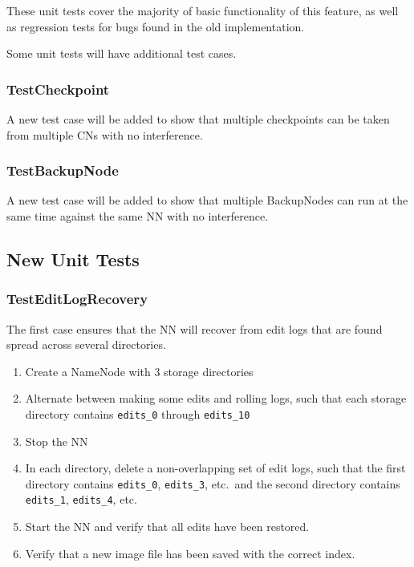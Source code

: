 \documentclass{article}
\begin{document}
These unit tests cover the majority of basic functionality of this feature, as well as regression tests for bugs found in the old implementation.

Some unit tests will have additional test cases.

\subsubsection{TestCheckpoint}

A new test case will be added to show that multiple checkpoints can be taken from multiple CNs with no interference.

\subsubsection{TestBackupNode}

A new test case will be added to show that multiple BackupNodes can run at the same time against the same NN with no interference.

\subsection{New Unit Tests}

\subsubsection{TestEditLogRecovery}

The first case ensures that the NN will recover from edit logs that are found spread across several directories.

\begin{enumerate}
\item Create a NameNode with 3 storage directories
\item Alternate between making some edits and rolling logs, such that each storage directory contains {\tt edits\_0} through {\tt edits\_10}
\item Stop the NN
\item In each directory, delete a non-overlapping set of edit logs, such that the first directory contains {\tt edits\_0}, {\tt edits\_3}, etc.\ and the second directory contains {\tt edits\_1}, {\tt edits\_4}, etc.
\item Start the NN and verify that all edits have been restored.
\item Verify that a new image file has been saved with the correct index.
\end{enumerate}
\end{document}
